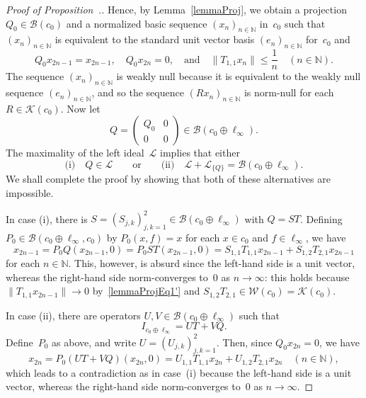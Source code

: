\documentclass[12pt]{amsart}
\theoremstyle{definition}
\numberwithin{equation}{section}
\begin{document}
\begin{proof}[Proof of
  Proposition~{\normalfont{\ref{propK1notinfgmaxleftideal}}}.]
  Hence, by Lemma~\ref{lemmaProj}, we obtain a projection
  \mbox{$Q_0\in\mathscr{B}(c_0)$} and a normalized basic sequence
  $(x_n)_{n\in{\ensuremath{\mathbb{N}}}}$ in~$c_0$ such that $(x_n)_{n\in{\ensuremath{\mathbb{N}}}}$ is equivalent
  to the standard unit vector basis $(e_n)_{n\in{\ensuremath{\mathbb{N}}}}$ for~$c_0$ and
  \begin{equation}\label{lemmaProjEq1'}
    Q_0x_{2n-1} = x_{2n-1},\quad Q_0x_{2n} = 0,\quad
    \text{and}\quad \| 
    T_{1,1}x_n\|{\ensuremath{\leqslant}}\frac{1}{n}\quad (n\in{\ensuremath{\mathbb{N}}}). \end{equation}
  The sequence  $(x_n)_{n\in{\ensuremath{\mathbb{N}}}}$ is weakly null 
  because it is equivalent to the weakly null
  se\-quence $(e_n)_{n\in{\ensuremath{\mathbb{N}}}}$, and so the sequence $(Rx_n)_{n\in{\ensuremath{\mathbb{N}}}}$ is
  norm-null for each $R\in\mathscr{K}(c_0)$. Now let
  \[ Q =
  \begin{pmatrix} Q_0 & 0\\ 0 &
    0\end{pmatrix}\in\mathscr{B}(c_0\oplus\ell_\infty). \] The
  maximality of the left ideal~$\mathscr{L}$ implies that either
  \[ \text{(i)}\quad Q\in\mathscr{L}\quad\quad
  \text{or}\quad\quad \text{(ii)}\quad \mathscr{L} +
  \mathscr{L}_{\{Q\}} =
  \mathscr{B}(c_0\oplus\ell_\infty). \] We shall complete the proof by
  showing that both of these alternatives are impossible.

  In case (i), there is $S =
  (S_{j,k})_{j,k=1}^2\in\mathscr{B}(c_0\oplus\ell_\infty)$ with $Q =
  ST$.  Defining $P_0\in\mathscr{B}(c_0\oplus\ell_\infty,c_0)$ by
  $P_0(x,f) = x$ for each $x\in c_0$ and $f\in\ell_\infty$, we have
  \[ x_{2n-1} = P_0Q(x_{2n-1},0) = P_0ST(x_{2n-1},0) =
  S_{1,1}T_{1,1}x_{2n-1} + S_{1,2}T_{2,1}x_{2n-1} \] for each
  $n\in{\ensuremath{\mathbb{N}}}$.  This, however, is absurd since the left-hand side is a
  unit vector, whereas the right-hand side norm-converges to~$0$ as
  $n\to\infty$: this holds because $\|T_{1,1}x_{2n-1}\|\to 0$
  by~\eqref{lemmaProjEq1'} and $S_{1,2}T_{2,1}\in\mathscr{W}(c_0) =
  \mathscr{K}(c_0)$.

  In case (ii), there are operators
  $U,V\in\mathscr{B}(c_0\oplus\ell_\infty)$  such that 
  $$I_{c_0\oplus\ell_\infty} = UT + VQ.$$ Define~$P_0$ as
  above, and write $U = (U_{j,k})_{j,k=1}^2$. Then, since
  $Q_0x_{2n}=0$, we have
  \[ x_{2n} = P_0(UT +VQ)(x_{2n},0) = 
  U_{1,1}T_{1,1}x_{2n} + U_{1,2}T_{2,1}x_{2n}\quad (n\in{\ensuremath{\mathbb{N}}}), \] which
  leads to a contradiction as in case~(i) because the left-hand side
  is a unit vector, whereas the right-hand side norm-converges to~$0$
  as $n\to\infty$.
\end{proof}
\end{document}
